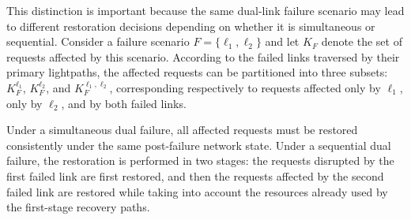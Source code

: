 \documentclass[conference]{IEEEtran}
\def \FailureIdx      {F}
\def \LinkIdx                   {\ell}
\def \RequestSet       {K}
\def \RequestIdx       {k}
\begin{document}
This distinction is important because the same dual-link failure scenario may lead to different restoration decisions depending on whether it is simultaneous or sequential. Consider a failure scenario $\FailureIdx = \{\LinkIdx_{1}, \LinkIdx_{2}\}$ and let $\RequestSet_{\FailureIdx}$ denote the set of requests affected by this scenario. According to the failed links traversed by their primary lightpaths, the affected requests can be partitioned into three subsets: $\RequestSet_{\FailureIdx}^{\LinkIdx_{1}}$, $\RequestSet_{\FailureIdx}^{\LinkIdx_{2}}$, and $\RequestSet_{\FailureIdx}^{\LinkIdx_{1},\LinkIdx_{2}}$, corresponding respectively to requests affected only by $\LinkIdx_{1}$, only by $\LinkIdx_{2}$, and by both failed links.

Under a simultaneous dual failure, all affected requests must be restored consistently under the same post-failure network state. Under a sequential dual failure, the restoration is performed in two stages: the requests disrupted by the first failed link are first restored, and then the requests affected by the second failed link are restored while taking into account the resources already used by the first-stage recovery paths.

\end{document}

